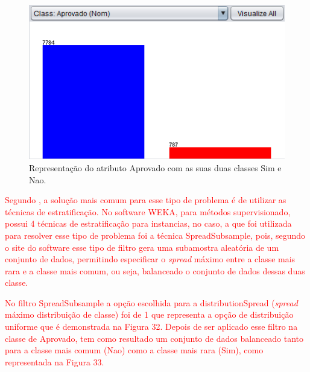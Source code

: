 \par
\begin{figure}[!htp]
	\begin{center}
    \caption{\label{fig:waveform_fig} Representação do atributo Aprovado com as suas duas classes Sim e Nao.}
	\includegraphics[scale=0.90]{Figuras/Atributo_aprovado.png}
	\end{center}
\end{figure}

\par
\textcolor{red}{}


\par
\textcolor{red}{Segundo , a solução mais comum para esse tipo de problema é de utilizar as técnicas de estratificação. No software WEKA, para métodos supervisionado, possui 4 técnicas de estratificação para instancias, no caso, a que foi utilizada para resolver esse tipo de problema foi a técnica SpreadSubsample, pois, segundo o site do software  esse tipo de filtro gera uma subamostra aleatória de um conjunto de dados, permitindo especificar o \textit{spread} máximo entre a classe mais rara e a classe mais comum, ou seja, balanceado o conjunto de dados dessas duas classe.}

\par
\textcolor{red}{No filtro SpreadSubsample a opção escolhida para a distributionSpread (\textit{spread} máximo distribuição de classe) foi de 1 que representa a opção de distribuição uniforme que é demonstrada na Figura 32. Depois de ser aplicado esse filtro na classe de Aprovado, tem como resultado um conjunto de dados balanceado tanto para a classe mais comum (Nao) como a classe mais rara (Sim), como representada na Figura 33.}

